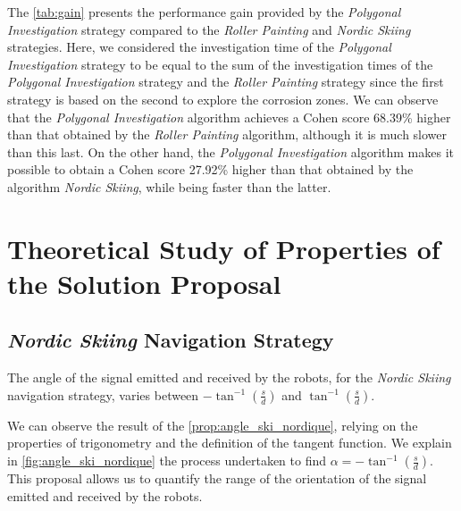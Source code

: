 The \ref{tab:gain} presents the performance gain provided by the \textit{Polygonal Investigation} strategy compared to the \textit{Roller Painting} and \textit{Nordic Skiing} strategies.
Here, we considered the investigation time of the \textit{Polygonal Investigation} strategy to be equal to the sum of the investigation times of the \textit{Polygonal Investigation} strategy and the \textit{Roller Painting} strategy since the first strategy is based on the second to explore the corrosion zones.
We can observe that the \textit{Polygonal Investigation} algorithm achieves a Cohen score 68.39\% higher than that obtained by the \textit{Roller Painting} algorithm, although it is much slower than this last.
On the other hand, the \textit{Polygonal Investigation} algorithm makes it possible to obtain a Cohen score 27.92\% higher than that obtained by the algorithm \textit{Nordic Skiing}, while being faster than the latter.

\section{Theoretical Study of Properties of the Solution Proposal}

\subsection*{\textit{Nordic Skiing} Navigation Strategy}

\begin{proposition}
	The angle of the signal emitted and received by the robots, for the \textit{Nordic Skiing} navigation strategy, varies between $-\tan^{-1}(\frac{s}{d})$ and $\tan ^{-1}(\frac{s}{d})$.
	\label{prop:angle_ski_nordique}
\end{proposition}

We can observe the result of the \ref{prop:angle_ski_nordique}, relying on the properties of trigonometry and the definition of the tangent function.
We explain in \ref{fig:angle_ski_nordique} the process undertaken to find $\alpha = -\tan^{-1}(\frac{s}{d})$.
This proposal allows us to quantify the range of the orientation of the signal emitted and received by the robots.

